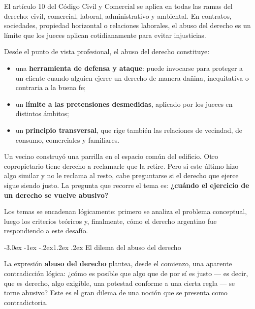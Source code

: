 \documentclass[12pt,oneside]{book}
\makeatletter
\renewcommand\section{\@startsection{section}{1}{\z@}%
  {-3.0ex \@plus -1ex \@minus -.2ex}{1.2ex \@plus .2ex}%
  {\normalfont\large\bfseries\color{acento}}}
\makeatother
\begin{document}
\begin{importante}
El artículo 10 del Código Civil y Comercial se aplica en todas las ramas del derecho: civil, comercial, laboral, administrativo y ambiental. En contratos, sociedades, propiedad horizontal o relaciones laborales, el abuso del derecho es un límite que los jueces aplican cotidianamente para evitar injusticias.
\end{importante}

Desde el punto de vista profesional, el abuso del derecho constituye:
\begin{itemize}
    \item una \textbf{herramienta de defensa y ataque}: puede invocarse para proteger a un cliente cuando alguien ejerce un derecho de manera dañina, inequitativa o contraria a la buena fe;
    \item un \textbf{límite a las pretensiones desmedidas}, aplicado por los jueces en distintos ámbitos;
    \item un \textbf{principio transversal}, que rige también las relaciones de vecindad, de consumo, comerciales y familiares.
\end{itemize}

\begin{ejemplo}
Un vecino construyó una parrilla en el espacio común del edificio. Otro copropietario tiene derecho a reclamarle que la retire. Pero si este último hizo algo similar y no le reclama al resto, cabe preguntarse si el derecho que ejerce sigue siendo justo. La pregunta que recorre el tema es: \textbf{¿cuándo el ejercicio de un derecho se vuelve abusivo?}
\end{ejemplo}

Los temas se encadenan lógicamente: primero se analiza el problema conceptual, luego los criterios teóricos y, finalmente, cómo el derecho argentino fue respondiendo a este desafío.

\section{El dilema del abuso del derecho}

La expresión \textbf{abuso del derecho} plantea, desde el comienzo, una aparente contradicción lógica: ¿cómo es posible que algo que de por sí es justo --- es decir, que es derecho, algo exigible, una potestad conforme a una cierta regla --- se torne abusivo? Este es el gran dilema de una noción que se presenta como contradictoria.
\end{document}
